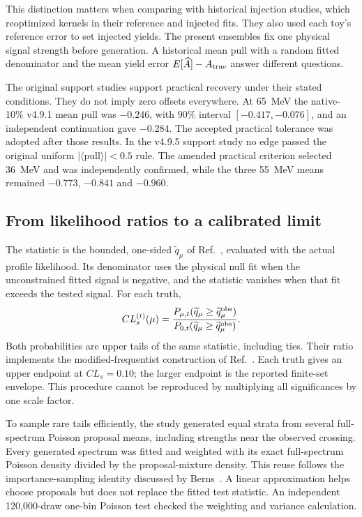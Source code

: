 This distinction matters when comparing with historical injection studies,
which reoptimized kernels in their reference and injected fits. They also
used each toy's reference error to set injected yields. The present
ensembles fix one physical signal strength before generation. A historical
mean pull with a random fitted denominator and the mean yield error
$E[\widehat A]-A_{\rm true}$ answer different questions.

The original support studies support practical recovery under their stated
conditions. They do not imply zero offsets everywhere. At 65~MeV the
native-10\% v4.9.1 mean pull was $-0.246$, with 90\% interval
$[-0.417,-0.076]$, and an independent continuation gave $-0.284$.
The accepted practical tolerance was adopted after those results. In the
v4.9.5 support study no edge passed the original uniform
$|\langle\mathrm{pull}\rangle|<0.5$ rule. The amended practical criterion
selected 36~MeV and was independently confirmed, while the three
55~MeV means remained $-0.773$, $-0.841$ and $-0.960$.

\subsection{From likelihood ratios to a calibrated limit}
The statistic is the bounded, one-sided $\widetilde q_\mu$ of
Ref.~\cite{Cowan2011}, evaluated with the actual profile likelihood.
Its denominator uses the physical null fit when the unconstrained fitted
signal is negative, and the statistic vanishes when that fit exceeds the
tested signal. For each truth,
\begin{equation}
 CL_s^{(t)}(\mu)=
 \frac{P_{\mu,t}(\widetilde q_\mu\geq\widetilde q_\mu^{\rm obs})}
      {P_{0,t}(\widetilde q_\mu\geq\widetilde q_\mu^{\rm obs})}.
 \label{v5-eq:empirical-cls}
\end{equation}
Both probabilities are upper tails of the same statistic, including ties.
Their ratio implements the modified-frequentist construction
of Ref.~\cite{Read2002}. Each truth gives an upper endpoint at
$CL_s=0.10$; the larger endpoint is the reported finite-set envelope.
This procedure cannot be reproduced by multiplying all significances by
one scale factor.

To sample rare tails efficiently, the study generated equal strata
from several full-spectrum Poisson proposal means, including strengths
near the observed crossing. Every generated spectrum was fitted and
weighted with its exact full-spectrum Poisson density divided by the
proposal-mixture density. This reuse follows the importance-sampling
identity discussed by Berns~\cite{Berns2024}. A linear approximation
helps choose proposals but does not replace the fitted test statistic.
An independent 120,000-draw one-bin Poisson test checked the weighting
and variance calculation.

